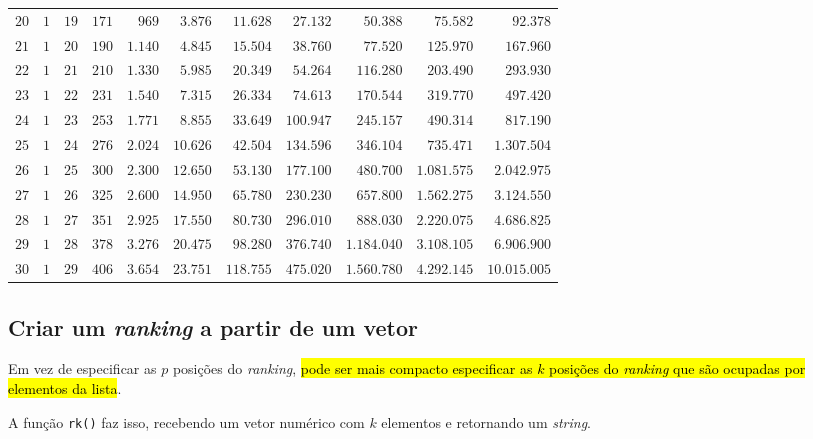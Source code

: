 \documentclass[
  letterpaper,
  DIV=11,
  numbers=noendperiod]{scrreprt}
\begin{document}
\begin{longtable*}{l|rrrrrrrrrr}
$20$ & $1$ & $19$ & $171$ & $969$ & $3.876$ & $11.628$ & $27.132$ & $50.388$ & $75.582$ & $92.378$ \\ 
$21$ & $1$ & $20$ & $190$ & $1.140$ & $4.845$ & $15.504$ & $38.760$ & $77.520$ & $125.970$ & $167.960$ \\ 
$22$ & $1$ & $21$ & $210$ & $1.330$ & $5.985$ & $20.349$ & $54.264$ & $116.280$ & $203.490$ & $293.930$ \\ 
$23$ & $1$ & $22$ & $231$ & $1.540$ & $7.315$ & $26.334$ & $74.613$ & $170.544$ & $319.770$ & $497.420$ \\ 
$24$ & $1$ & $23$ & $253$ & $1.771$ & $8.855$ & $33.649$ & $100.947$ & $245.157$ & $490.314$ & $817.190$ \\ 
$25$ & $1$ & $24$ & $276$ & $2.024$ & $10.626$ & $42.504$ & $134.596$ & $346.104$ & $735.471$ & $1.307.504$ \\ 
$26$ & $1$ & $25$ & $300$ & $2.300$ & $12.650$ & $53.130$ & $177.100$ & $480.700$ & $1.081.575$ & $2.042.975$ \\ 
$27$ & $1$ & $26$ & $325$ & $2.600$ & $14.950$ & $65.780$ & $230.230$ & $657.800$ & $1.562.275$ & $3.124.550$ \\ 
$28$ & $1$ & $27$ & $351$ & $2.925$ & $17.550$ & $80.730$ & $296.010$ & $888.030$ & $2.220.075$ & $4.686.825$ \\ 
$29$ & $1$ & $28$ & $378$ & $3.276$ & $20.475$ & $98.280$ & $376.740$ & $1.184.040$ & $3.108.105$ & $6.906.900$ \\ 
$30$ & $1$ & $29$ & $406$ & $3.654$ & $23.751$ & $118.755$ & $475.020$ & $1.560.780$ & $4.292.145$ & $10.015.005$ \\ 
\bottomrule
\end{longtable*}

\subsection{\texorpdfstring{Criar um \emph{ranking} a partir de um
vetor}{Criar um ranking a partir de um vetor}}\label{criar-um-ranking-a-partir-de-um-vetor}

Em vez de especificar as $p$ posições do \emph{ranking}, {\hl{pode ser
mais compacto especificar as $k$ posições do \emph{ranking} que são
ocupadas por elementos da lista}}.

A função \texttt{rk()} faz isso, recebendo um vetor numérico com $k$
elementos e retornando um \emph{string}.
\end{document}
